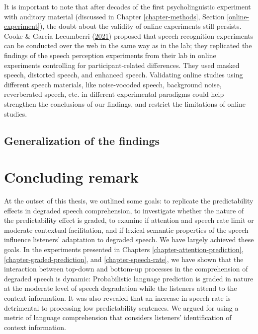 \documentclass[a4paper, nobind]{templates/ociamthesis}
\begin{document}
It is important to note that after decades of the first psycholinguistic experiment with auditory material (discussed in Chapter \ref{chapter-methods}, Section \ref{online-experiment}),
the doubt about the validity of online experiments still persists.
Cooke \& Garcia Lecumberri (\protect\hyperlink{ref-Cooke2021}{2021}) proposed that speech recognition experiments can be conducted over the web in the same way as in the lab;
they replicated the findings of the speech perception experiments from their lab in online experiments controlling for participant-related differences.
They used masked speech, distorted speech, and enhanced speech.
Validating online studies using different speech materials, like noise-vocoded speech, background noise, reverberated speech, etc. in different experimental paradigms could help strengthen the conclusions of our findings,
and restrict the limitations of online studies.

\hypertarget{generalization-of-the-findings}{%
\subsection{Generalization of the findings}\label{generalization-of-the-findings}}

\hypertarget{concluding-remark}{%
\section{Concluding remark}\label{concluding-remark}}

At the outset of this thesis, we outlined some goals:
to replicate the predictability effects in degraded speech comprehension,
to investigate whether the nature of the predictability effect is graded,
to examine if attention and speech rate limit or moderate contextual facilitation,
and if lexical-semantic properties of the speech influence listeners' adaptation to degraded speech.
We have largely achieved these goals.
In the experiments presented in Chapters \ref{chapter-attention-prediction}, \ref{chapter-graded-prediction}, and \ref{chapter-speech-rate}, we have shown that the interaction between top-down and bottom-up processes in the comprehension of degraded speech is dynamic:
Probabilistic language prediction is graded in nature at the moderate level of speech degradation while the listeners attend to the context information.
It was also revealed that an increase in speech rate is detrimental to processing low predictability sentences.
We argued for using a metric of language comprehension that considers listeners' identification of context information.
\end{document}
